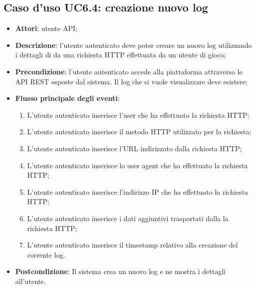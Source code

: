 \subsection{Caso d'uso UC6.4: creazione nuovo log}
\begin{itemize}
\item \textbf{Attori}: utente API;
\item \textbf{Descrizione}: l'utente autenticato deve poter creare un nuovo log utilizzando i dettagli di da una richiesta HTTP effettuata da un utente di gioco; 
      \item \textbf{Precondizione}: l'utente autenticato accede alla piattaforma attraverso le API REST esposte dal sistema. Il log che si vuole visualizzare deve esistere;

        \item \textbf{Flusso principale degli eventi}:
          \begin{enumerate}
          \item L'utente autenticato inserisce l'user che ha effettuato la richiesta HTTP;
          \item L'utente autenticato inserisce il metodo HTTP utilizzato per la richiesta;
          \item L'utente autenticato inserisce l'URL indirizzato dalla richiesta HTTP;
          \item L'utente autenticato inserisce lo user agent che ha effettuato la richiesta HTTP;
          \item L'utente autenticato inserisce l'indirizzo IP che ha effettuato la richiesta HTTP;
          \item L'utente autenticato inserisce i dati aggiuntivi trasportati dalla la richiesta HTTP;
          \item L'utente autenticato inserisce il timestamp relativo alla creazione del corrente log.

      \end{enumerate}
    \item \textbf{Postcondizione}: Il sistema crea un nuovo log e ne mostra i dettagli all'utente.
  \end{itemize}
\hypertarget{UC6.5}{}
